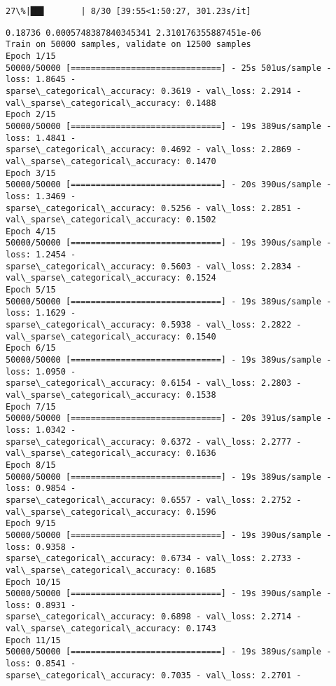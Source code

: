 \documentclass[11pt]{article}
\begin{document}
    \begin{Verbatim}[commandchars=\\\{\}]
 27\%|██▋       | 8/30 [39:55<1:50:27, 301.23s/it]
    \end{Verbatim}

    \begin{Verbatim}[commandchars=\\\{\}]
0.18736 0.0005748387840345341 2.310176355887451e-06
Train on 50000 samples, validate on 12500 samples
Epoch 1/15
50000/50000 [==============================] - 25s 501us/sample - loss: 1.8645 -
sparse\_categorical\_accuracy: 0.3619 - val\_loss: 2.2914 -
val\_sparse\_categorical\_accuracy: 0.1488
Epoch 2/15
50000/50000 [==============================] - 19s 389us/sample - loss: 1.4841 -
sparse\_categorical\_accuracy: 0.4692 - val\_loss: 2.2869 -
val\_sparse\_categorical\_accuracy: 0.1470
Epoch 3/15
50000/50000 [==============================] - 20s 390us/sample - loss: 1.3469 -
sparse\_categorical\_accuracy: 0.5256 - val\_loss: 2.2851 -
val\_sparse\_categorical\_accuracy: 0.1502
Epoch 4/15
50000/50000 [==============================] - 19s 390us/sample - loss: 1.2454 -
sparse\_categorical\_accuracy: 0.5603 - val\_loss: 2.2834 -
val\_sparse\_categorical\_accuracy: 0.1524
Epoch 5/15
50000/50000 [==============================] - 19s 389us/sample - loss: 1.1629 -
sparse\_categorical\_accuracy: 0.5938 - val\_loss: 2.2822 -
val\_sparse\_categorical\_accuracy: 0.1540
Epoch 6/15
50000/50000 [==============================] - 19s 389us/sample - loss: 1.0950 -
sparse\_categorical\_accuracy: 0.6154 - val\_loss: 2.2803 -
val\_sparse\_categorical\_accuracy: 0.1538
Epoch 7/15
50000/50000 [==============================] - 20s 391us/sample - loss: 1.0342 -
sparse\_categorical\_accuracy: 0.6372 - val\_loss: 2.2777 -
val\_sparse\_categorical\_accuracy: 0.1636
Epoch 8/15
50000/50000 [==============================] - 19s 389us/sample - loss: 0.9854 -
sparse\_categorical\_accuracy: 0.6557 - val\_loss: 2.2752 -
val\_sparse\_categorical\_accuracy: 0.1596
Epoch 9/15
50000/50000 [==============================] - 19s 390us/sample - loss: 0.9358 -
sparse\_categorical\_accuracy: 0.6734 - val\_loss: 2.2733 -
val\_sparse\_categorical\_accuracy: 0.1685
Epoch 10/15
50000/50000 [==============================] - 19s 390us/sample - loss: 0.8931 -
sparse\_categorical\_accuracy: 0.6898 - val\_loss: 2.2714 -
val\_sparse\_categorical\_accuracy: 0.1743
Epoch 11/15
50000/50000 [==============================] - 19s 389us/sample - loss: 0.8541 -
sparse\_categorical\_accuracy: 0.7035 - val\_loss: 2.2701 -

\end{Verbatim}
\end{document}
